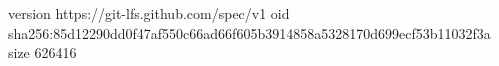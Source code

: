 version https://git-lfs.github.com/spec/v1
oid sha256:85d12290dd0f47af550c66ad66f605b3914858a5328170d699ecf53b11032f3a
size 626416
